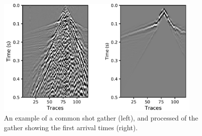 \begin{figure}
 \centering
 \includegraphics[width=0.9\textwidth]{figures/chap04_field_data/dataGulfAqaba} 
 \caption{ An example of a common shot gather (left), and processed of the gather showing the first arrival times (right).}
 \label{fig:shot_gather_fa}
\end{figure}